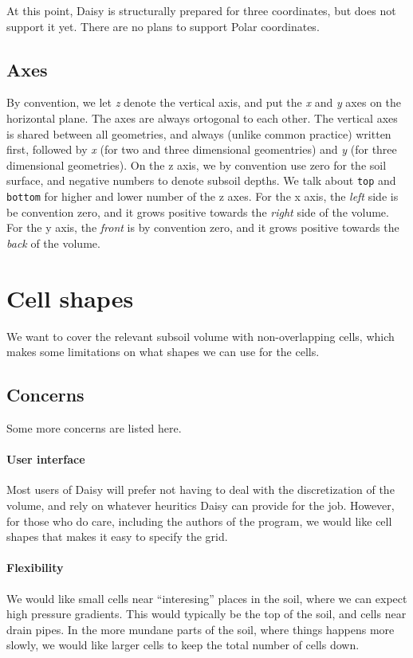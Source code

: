 \documentclass[a4paper,11pt,twoside]{article}
\begin{document}
At this point, Daisy is structurally prepared for three coordinates,
but does not support it yet.  There are no plans to support Polar
coordinates.

\subsection{Axes}

By convention, we let \emph{z} denote the vertical axis, and put the
\emph{x} and \emph{y} axes on the horizontal plane.  The axes are
always ortogonal to each other.  The vertical axes is shared between
all geometries, and always (unlike common practice) written first,
followed by \emph{x} (for two and three dimensional geomentries) and
\emph{y} (for three dimensional geometries).  On the z axis, we by
convention use zero for the soil surface, and negative numbers to
denote subsoil depths.  We talk about \texttt{top} and \texttt{bottom}
for higher and lower number of the z axes.  For the x axis, the \emph{left}
side is be convention zero, and it grows positive towards the
\emph{right} side of the volume.  For the y axis, the \emph{front} is
by convention zero, and it grows positive towards the \emph{back} of
the volume.

\section{Cell shapes }

We want to cover the relevant subsoil volume with non-overlapping
cells, which makes some limitations on what shapes we can use for the
cells.  

\subsection{Concerns}

Some more concerns are listed here.

\paragraph{User interface}
Most users of Daisy will prefer not having to deal with the
discretization of the volume, and rely on whatever heuritics Daisy can
provide for the job.  However, for those who do care, including the
authors of the program, we would like cell shapes that makes it easy
to specify the grid.

\paragraph{Flexibility}
We would like small cells near ``interesing'' places in the soil,
where we can expect high pressure gradients.  This would typically be
the top of the soil, and cells near drain pipes.  In the more mundane
parts of the soil, where things happens more slowly, we would like
larger cells to keep the total number of cells down.
\end{document}
